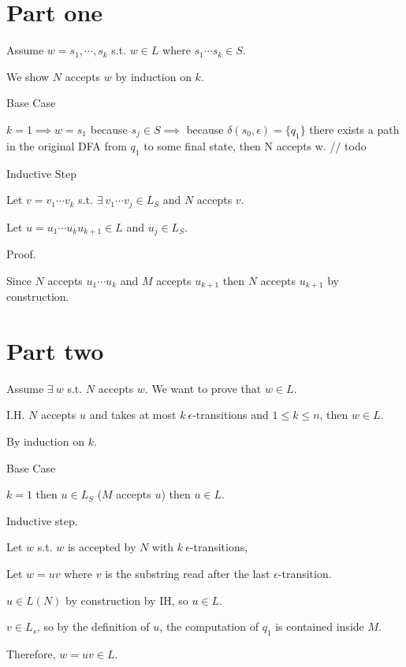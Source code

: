 \documentclass[11pt,addpoints,answers]{exam}
\newcommand{\1}{\mathbf{1}}
\begin{document}
\section{Part one}

\noindent Assume $w = s_1, \cdots, s_k$ s.t. $w \in L$ where $s_1 \cdots s_k \in S$.

\noindent We show $N$ accepts $w$ by induction on $k$.

\medskip

\noindent Base Case

\noindent $k = 1 \implies w = s_1$ because $s_j \in S \implies$ because $\delta(s_0, \epsilon) = \{ q_1 \}$ there exists a path in the original DFA from $q_1$ to some final state, then N accepts w. // todo

\medskip

\noindent Inductive Step

\noindent Let $v = v_1 \cdots v_k$ s.t. $\exists \ v_1 \cdots v_j \in L_S$ and $N$ accepts $v$.

\noindent Let $u = u_1 \cdots u_k u_{k + 1} \in L$ and $u_j \in L_S$.

\noindent Proof.

\noindent Since $N$ accepts $u_1 \cdots u_k$ and $M$ accepts $u_{k + 1}$ then $N$ accepts $u_{k+1}$ by construction.

\section{Part two}

\noindent Assume $\exists \ w$ s.t. $N$ accepts $w$. We want to prove that $w \in L$.

\noindent I.H. $N$ accepts $u$ and takes at most $k \ \epsilon$-transitions and $1 \leq k \leq n$, then $w \in L$.

\noindent By induction on $k$.

\medskip

\noindent Base Case

\noindent $k = 1$ then $u \in L_S$ ($M$ accepts $u$) then $u \in L$.

\medskip

\noindent Inductive step.

\noindent Let $w$ s.t. $w$ is accepted by $N$ with $k \ \epsilon$-transitions,

\noindent Let $w = uv$ where $v$ is the substring read after the last $\epsilon$-transition.

\noindent $u \in L(N)$ by construction by IH, so $u \in L$.

\noindent $v \in L_s$, so by the definition of $u$, the computation of $q_1$ is contained inside $M$.

\noindent Therefore, $w = uv \in L$.
\end{document}
